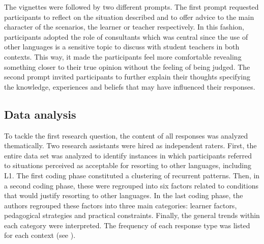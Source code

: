 \documentclass[output=paper]{../langscibook}
\begin{document}
The vignettes were followed by two different prompts. The first prompt requested participants to reflect on the situation described and to offer advice to the main character of the scenarios, the learner or teacher respectively. In this fashion, participants adopted the role of consultants which was central since the use of other languages is a sensitive topic to discuss with student teachers in both contexts. This way, it made the participants feel more comfortable revealing something closer to their true opinion without the feeling of being judged. The second prompt invited participants to further explain their thoughts specifying the knowledge, experiences and beliefs that may have influenced their responses.



\subsection{Data analysis}
To tackle the first research question, the content of all responses was analyzed thematically. Two research assistants were hired as independent raters. First, the entire data set was analyzed to identify instances in which participants referred to situations perceived as acceptable for resorting to other languages, including L1. The first coding phase constituted a clustering of recurrent patterns. Then, in a second coding phase, these were regrouped into six factors related to conditions that would justify resorting to other languages. In the last coding phase, the authors regrouped these factors into three main categories: learner factors, pedagogical strategies and practical constraints. Finally, the general trends within each category were interpreted. The frequency of each response type was listed for each context (see ).
\end{document}
